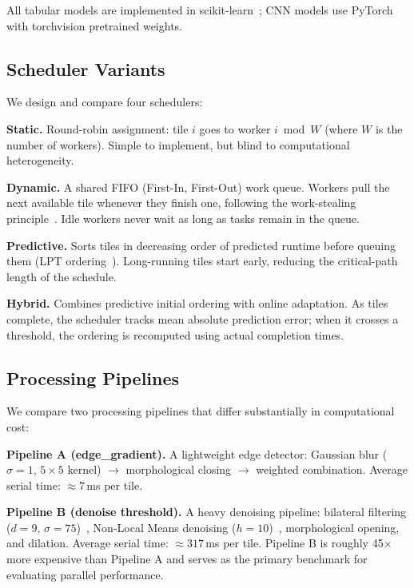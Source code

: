 \documentclass[acmsmall]{acmart}
\begin{document}
All tabular models are implemented in scikit-learn~\cite{Pedregosa2011}; CNN models use PyTorch~\cite{Paszke2019} with torchvision pretrained weights.

\subsection{Scheduler Variants}

We design and compare four schedulers:

\textbf{Static.} Round-robin assignment: tile $i$ goes to worker $i \bmod W$ (where $W$ is the number of workers). Simple to implement, but blind to computational heterogeneity.

\textbf{Dynamic.} A shared FIFO (First-In, First-Out) work queue. Workers pull the next available tile whenever they finish one, following the work-stealing principle~\cite{Blumofe1999}. Idle workers never wait as long as tasks remain in the queue.

\textbf{Predictive.} Sorts tiles in decreasing order of predicted runtime before queuing them (LPT ordering~\cite{Graham1969}). Long-running tiles start early, reducing the critical-path length of the schedule.

\textbf{Hybrid.} Combines predictive initial ordering with online adaptation. As tiles complete, the scheduler tracks mean absolute prediction error; when it crosses a threshold, the ordering is recomputed using actual completion times.

\subsection{Processing Pipelines}

We compare two processing pipelines that differ substantially in computational cost:

\textbf{Pipeline A (edge\_gradient).} A lightweight edge detector:
Gaussian blur ($\sigma = 1$, $5 \times 5$ kernel) $\rightarrow$ morphological closing $\rightarrow$ weighted combination.
Average serial time: $\approx 7$\,ms per tile.

\textbf{Pipeline B (denoise threshold).} A heavy denoising pipeline:
bilateral filtering ($d = 9$, $\sigma = 75$)~\cite{Tomasi1998}, Non-Local Means denoising ($h = 10$)~\cite{Buades2005}, morphological opening, and dilation.
Average serial time: $\approx 317$\,ms per tile.
Pipeline B is roughly 45$\times$ more expensive than Pipeline A and serves as the primary benchmark for evaluating parallel performance.
\end{document}
